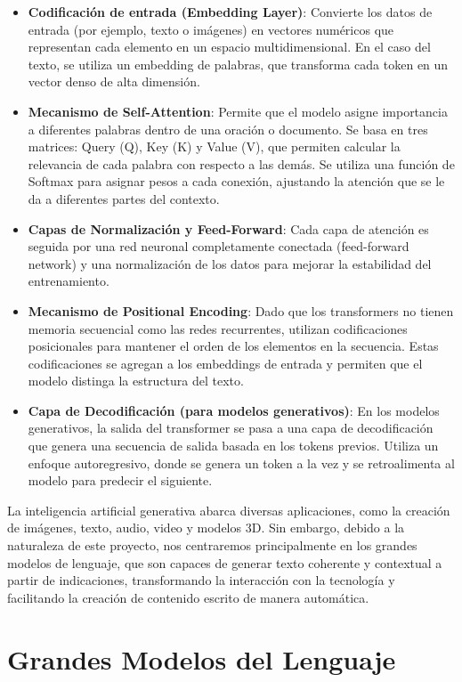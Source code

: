 \begin{itemize}
    \item \textbf{Codificación de entrada (Embedding Layer)}: Convierte los datos de entrada (por ejemplo, texto o imágenes) en vectores numéricos que representan cada elemento en un espacio multidimensional. En el caso del texto, se utiliza un embedding de palabras, que transforma cada token en un vector denso de alta dimensión.
    \item \textbf{Mecanismo de Self-Attention}: Permite que el modelo asigne importancia a diferentes palabras dentro de una oración o documento. Se basa en tres matrices: Query (Q), Key (K) y Value (V), que permiten calcular la relevancia de cada palabra con respecto a las demás. Se utiliza una función de Softmax para asignar pesos a cada conexión, ajustando la atención que se le da a diferentes partes del contexto.
    \item \textbf{Capas de Normalización y Feed-Forward}: Cada capa de atención es seguida por una red neuronal completamente conectada (feed-forward network) y una normalización de los datos para mejorar la estabilidad del entrenamiento.
    \item \textbf{Mecanismo de Positional Encoding}: Dado que los transformers no tienen memoria secuencial como las redes recurrentes, utilizan codificaciones posicionales para mantener el orden de los elementos en la secuencia. Estas codificaciones se agregan a los embeddings de entrada y permiten que el modelo distinga la estructura del texto.
    \item \textbf{Capa de Decodificación (para modelos generativos)}: En los modelos generativos, la salida del transformer se pasa a una capa de decodificación que genera una secuencia de salida basada en los tokens previos. Utiliza un enfoque autoregresivo, donde se genera un token a la vez y se retroalimenta al modelo para predecir el siguiente.
\end{itemize}

La inteligencia artificial generativa abarca diversas aplicaciones, como la creación de imágenes, texto, audio, video y modelos 3D. 
Sin embargo, debido a la naturaleza de este proyecto, nos centraremos principalmente en los grandes modelos de lenguaje, que son capaces de generar texto coherente y contextual a partir de indicaciones, transformando la interacción con la tecnología y facilitando la creación de contenido escrito de manera automática.

\section{Grandes Modelos del Lenguaje}

